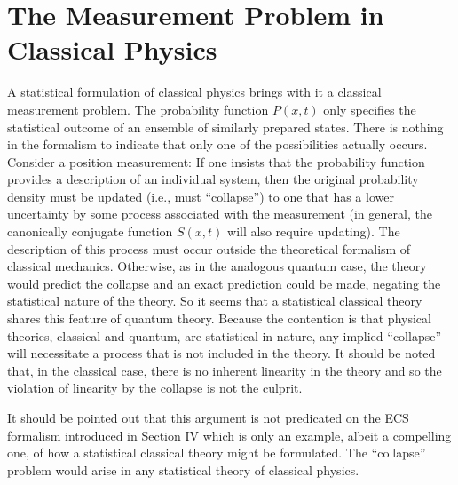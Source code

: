 \documentclass [12pt]{revtex4}
\begin{document}
\section{The Measurement Problem in Classical Physics}\label{MPCP}

A statistical formulation of classical physics brings with it a
{classical measurement problem}. The probability function $P(x,t)$
only specifies the statistical outcome of an
ensemble of similarly prepared states. There is nothing in the
formalism to indicate that only one of the possibilities actually
occurs. Consider a position measurement: If one insists that the
probability function provides a description of an individual system,
then the original probability density must be updated (i.e., must
``collapse'')  to one that has
a lower uncertainty by some process associated with the measurement
(in general, the canonically conjugate function $S(x,t)$ will also require
updating). The description of this process must occur outside the
theoretical formalism of classical mechanics. Otherwise, as in the analogous
quantum case, the theory would predict the collapse and an exact
prediction could be made, negating the statistical nature of the
theory. So it seems that a statistical classical theory shares this
feature of quantum theory. Because
the contention is that physical theories, classical and quantum, are
statistical in nature, any implied ``collapse'' will necessitate
a process that is not included in the theory. It should be noted that, in the classical
case, there is no inherent linearity in the theory and so the
violation of linearity by the collapse is not the culprit.

It should be pointed out that this argument is not predicated on the
ECS formalism introduced in Section IV which is only an example, albeit a
compelling one, of how a statistical classical theory might be formulated.
The ``collapse'' problem would arise in any statistical theory of classical
physics.
\end{document}

